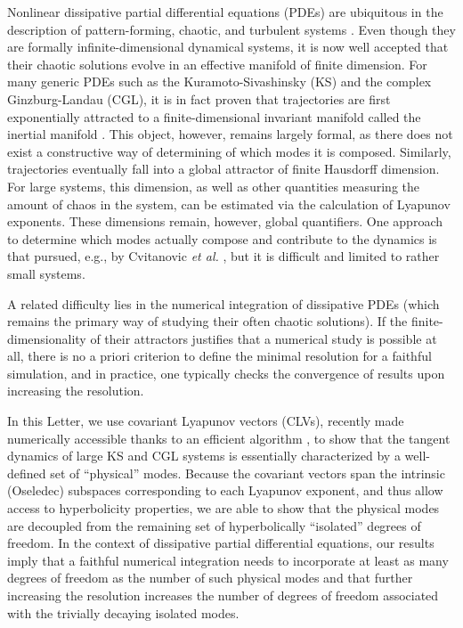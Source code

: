 \documentclass[prl,twocolumn,twoside,showpacs,superscriptaddress]{revtex4}
\begin{document}
Nonlinear dissipative partial differential equations (PDEs) are ubiquitous
in the description of pattern-forming, chaotic, and turbulent 
systems \cite{Cross_Hohenberg-RMP1993}. 
Even though they are formally infinite-dimensional dynamical systems, 
it is now well accepted that their chaotic solutions evolve in an effective
manifold of finite dimension.
For many generic PDEs such as the Kuramoto-Sivashinsky (KS) and
 the complex Ginzburg-Landau (CGL),
it is in fact proven that trajectories are first exponentially attracted
 to a finite-dimensional invariant manifold called the inertial manifold
\cite{InertialManifold}.
This object, however, remains largely formal, as there does not exist
a constructive way of determining of which modes it is composed.
Similarly, trajectories eventually fall into a global attractor 
of finite Hausdorff dimension. For large systems,
this dimension, as well as other quantities measuring the amount of 
chaos in the system, can be estimated via the calculation of Lyapunov exponents.
These dimensions remain, however, global quantifiers. 
One approach to determine which modes actually compose and contribute
to the dynamics is that pursued, e.g., by Cvitanovic {\it et al.}
 \cite{UPOExpansion},
but it is difficult and limited to rather small systems.

A related difficulty lies in
the numerical integration of dissipative PDEs (which remains the primary
way of studying their often chaotic solutions). If the finite-dimensionality
of their attractors justifies that a
numerical study is possible at all, there is no a priori criterion to define
the minimal resolution for a faithful simulation,
and in practice, one typically checks the convergence of results
upon increasing the resolution.

In this Letter, we use covariant Lyapunov vectors (CLVs), recently
made numerically accessible thanks to an efficient
algorithm \cite{Ginelli_etal-PRL2007}, to show that the tangent dynamics
of large KS and CGL systems is essentially characterized by a well-defined set of 
``physical'' modes. Because the covariant vectors span
the intrinsic (Oseledec) subspaces corresponding to each Lyapunov exponent,
and thus allow access to hyperbolicity properties, we are able to show that the physical
modes are decoupled from the remaining set of hyperbolically ``isolated''
degrees of freedom.
In the
context of dissipative partial differential equations, our results imply
that a faithful numerical integration needs to incorporate at least as
many degrees of freedom as the number of such physical modes and that
further increasing the resolution 
increases the number of degrees of freedom associated
with the trivially decaying isolated modes.
\end{document}
